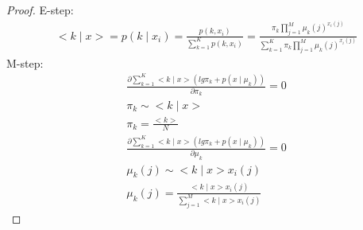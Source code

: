 \documentclass[12pt]{article}
\begin{document}
\begin{proof}
E-step:
	\begin{align*}
		<k\mid x> = p(k\mid x_i) = \frac{p(k, x_i)}{\sum_{k=1}^{K}p(k,x_i)} = \frac{\pi_k \prod_{j=1}^{M} \mu_k(j)^{x_i(j)}}{\sum_{k=1}^K \pi_k \prod_{j=1}^{M} \mu_k(j)^{x_i(j)}}
	\end{align*}
M-step:
	\begin{align*}
		\frac{\partial \sum_{k=1}^K <k\mid x> (lg \pi_k + p(x\mid \mu_k))}{\partial \pi_k} = 0 \\
		\pi_k \sim <k \mid x> \\
		\pi_k =  \frac{<k>}{N}
	\end{align*}
	\begin{align*}
		\frac{\partial \sum_{k=1}^K <k\mid x> (lg \pi_k + p(x\mid \mu_k))}{\partial \mu_k} = 0 \\
		\mu_k(j) \sim <k \mid x> x_i(j) \\
		\mu_k(j) =  \frac{<k \mid x> x_i(j)}{\sum_{j=1}^M <k \mid x> x_i(j)}
	\end{align*}
\end{proof}
 
\end{document}
